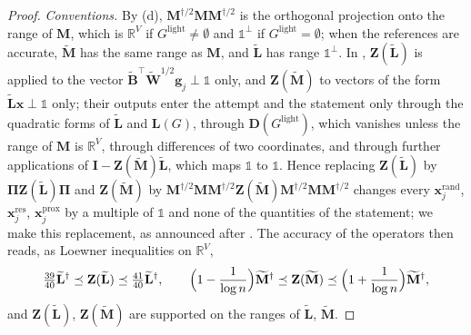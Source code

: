 \documentclass[11pt]{article}
\theoremstyle{remark}
\newcommand{\BB}{\mathbf B}
\newcommand{\BBtil}{{\widetilde{\BB}}}
\newcommand{\DD}{\mathbf D}
\renewcommand{\gg}{{\mathbf g}}
\newcommand{\II}{\mathbf I}
\newcommand{\LL}{\mathbf L}
\newcommand{\LLtil}{{\widetilde{\LL}}}
\newcommand{\MM}{\mathbf M}
\newcommand{\MMtil}{{\widetilde{\MM}}}
\newcommand{\PPi}{{\boldsymbol\Pi}}
\newcommand{\WW}{\mathbf W}
\newcommand{\WWtil}{{\widetilde{\WW}}}
\newcommand{\xx}{\mathbf x}
\newcommand{\xxproxy}{\xx^{\mathrm{prox}}}
\newcommand{\xxrand}{\xx^{\mathrm{rand}}}
\newcommand{\xxres}{\xx^{\mathrm{res}}}
\newcommand{\ZZ}{\mathbf Z}
\newcommand{\Gl}{G^{\mathrm{light}}}
\newcommand{\R}{\mathbb R}
\newcommand{\oone}{\mathds{1}}
\begin{document}
\begin{proof}
\emph{Conventions.}
By (d), $\MM^{\dag/2}\MM\MM^{\dag/2}$ is the orthogonal
projection onto the range of $\MM$, which is $\R^{V}$ if $\Gl\neq\emptyset$
and $\oone^{\perp}$ if $\Gl=\emptyset$; when the references are accurate,
$\MMtil$ has the same range as $\MM$, and $\LLtil$ has range $\oone^{\perp}$.
In , $\ZZ(\LLtil)$ is applied to the vector
$\BBtil^{\top}\WWtil^{1/2}\gg_j\perp\oone$ only, and $\ZZ(\MMtil)$ to vectors
of the form $\LLtil\xx\perp\oone$ only; their outputs enter the attempt and
the statement only through the quadratic forms of $\LLtil$ and $\LL(G)$,
through $\DD(\Gl)$, which vanishes unless the range of $\MM$ is $\R^{V}$,
through differences of two coordinates, and through further applications
of $\II-\ZZ(\MMtil)\LLtil$, which maps $\oone$ to $\oone$.
Hence replacing $\ZZ(\LLtil)$ by $\PPi\ZZ(\LLtil)\PPi$ and $\ZZ(\MMtil)$ by
$\MM^{\dag/2}\MM\MM^{\dag/2}\ZZ(\MMtil)\MM^{\dag/2}\MM\MM^{\dag/2}$ changes
every $\xxrand_j$, $\xxres_j$, $\xxproxy_j$ by a multiple of $\oone$ and
none of the quantities of the statement; we make this replacement, as
announced after .
The accuracy of the operators then reads, as Loewner inequalities on $\R^{V}$,
\begin{equation}\label{eq:ops}
\tfrac{39}{40}\LLtil^{\dag}\preceq\ZZ(\LLtil)\preceq\tfrac{41}{40}\LLtil^{\dag},
\qquad
\Bigl(1-\frac1{\log n}\Bigr)\MMtil^{\dag}\preceq\ZZ(\MMtil)\preceq\Bigl(1+\frac1{\log n}\Bigr)\MMtil^{\dag},
\end{equation}
and $\ZZ(\LLtil)$, $\ZZ(\MMtil)$ are supported on the ranges of $\LLtil$,
$\MMtil$.


\end{proof}
\end{document}
